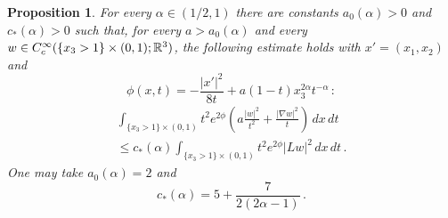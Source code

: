 \documentclass[11pt,letterpaper]{article}
\numberwithin{equation}{section}
\theoremstyle{plain}
\newtheorem{proposition}[theorem]{Proposition}
\theoremstyle{definition}
\theoremstyle{remark}
\begin{document}
\begin{proposition}\label{prop:carleman-halfspace}
For every $\alpha\in(1/2,1)$ there are constants $a_0(\alpha)>0$ and $c_*(\alpha)>0$ such that, for every $a>a_0(\alpha)$ and every
$w\in C_c^\infty(\{x_3>1\}\times(0,1);\mathbb{R}^3)$, the following estimate holds with
$x'=(x_1,x_2)$ and
\[
 \phi(x,t)=-\frac{|x'|^2}{8t}+a(1-t)x_3^{2\alpha}t^{-\alpha}\,:
\]
\begin{equation}\label{eq:carleman-halfspace}
\begin{aligned}
 \int_{\{x_3>1\}\times(0,1)}t^2e^{2\phi}
       \left(a\frac{|w|^2}{t^2}+\frac{|\nabla w|^2}{t}\right)\,dx\,dt\\
 \le c_*(\alpha)\int_{\{x_3>1\}\times(0,1)}t^2e^{2\phi}|Lw|^2\,dx\,dt\,.
\end{aligned}
\end{equation}
One may take $a_0(\alpha)=2$ and
\[
 c_*(\alpha)=5+\frac{7}{2(2\alpha-1)}\,.
\]
\end{proposition}
\end{document}
